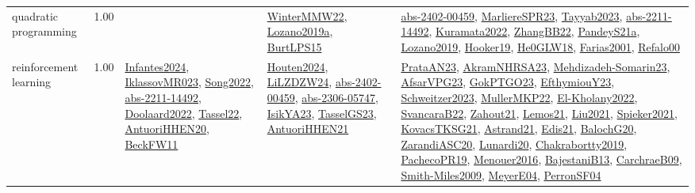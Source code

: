 {\begin{longtable}{p{3cm}r>{\raggedright\arraybackslash}p{6cm}>{\raggedright\arraybackslash}p{6cm}>{\raggedright\arraybackslash}p{8cm}}
\index{quadratic programming}\index{Algorithms!quadratic programming}quadratic programming &  1.00 &  & \hyperref[detail:WinterMMW22]{WinterMMW22}, \hyperref[detail:Lozano2019a]{Lozano2019a}, \hyperref[detail:BurtLPS15]{BurtLPS15} & \hyperref[detail:abs-2402-00459]{abs-2402-00459}, \hyperref[detail:MarliereSPR23]{MarliereSPR23}, \hyperref[detail:Tayyab2023]{Tayyab2023}, \hyperref[detail:abs-2211-14492]{abs-2211-14492}, \hyperref[detail:Kuramata2022]{Kuramata2022}, \hyperref[detail:ZhangBB22]{ZhangBB22}, \hyperref[detail:PandeyS21a]{PandeyS21a}, \hyperref[detail:Lozano2019]{Lozano2019}, \hyperref[detail:Hooker19]{Hooker19}, \hyperref[detail:He0GLW18]{He0GLW18}, \hyperref[detail:Farias2001]{Farias2001}, \hyperref[detail:Refalo00]{Refalo00}\\
\index{reinforcement learning}\index{Algorithms!reinforcement learning}reinforcement learning &  1.00 & \hyperref[detail:Infantes2024]{Infantes2024}, \hyperref[detail:IklassovMR023]{IklassovMR023}, \hyperref[detail:Song2022]{Song2022}, \hyperref[detail:abs-2211-14492]{abs-2211-14492}, \hyperref[detail:Doolaard2022]{Doolaard2022}, \hyperref[detail:Tassel22]{Tassel22}, \hyperref[detail:AntuoriHHEN20]{AntuoriHHEN20}, \hyperref[detail:BeckFW11]{BeckFW11} & \hyperref[detail:Houten2024]{Houten2024}, \hyperref[detail:LiLZDZW24]{LiLZDZW24}, \hyperref[detail:abs-2402-00459]{abs-2402-00459}, \hyperref[detail:abs-2306-05747]{abs-2306-05747}, \hyperref[detail:IsikYA23]{IsikYA23}, \hyperref[detail:TasselGS23]{TasselGS23}, \hyperref[detail:AntuoriHHEN21]{AntuoriHHEN21} & \hyperref[detail:PrataAN23]{PrataAN23}, \hyperref[detail:AkramNHRSA23]{AkramNHRSA23}, \hyperref[detail:Mehdizadeh-Somarin23]{Mehdizadeh-Somarin23}, \hyperref[detail:AfsarVPG23]{AfsarVPG23}, \hyperref[detail:GokPTGO23]{GokPTGO23}, \hyperref[detail:EfthymiouY23]{EfthymiouY23}, \hyperref[detail:Schweitzer2023]{Schweitzer2023}, \hyperref[detail:MullerMKP22]{MullerMKP22}, \hyperref[detail:El-Kholany2022]{El-Kholany2022}, \hyperref[detail:SvancaraB22]{SvancaraB22}, \hyperref[detail:Zahout21]{Zahout21}, \hyperref[detail:Lemos21]{Lemos21}, \hyperref[detail:Liu2021]{Liu2021}, \hyperref[detail:Spieker2021]{Spieker2021}, \hyperref[detail:KovacsTKSG21]{KovacsTKSG21}, \hyperref[detail:Astrand21]{Astrand21}, \hyperref[detail:Edis21]{Edis21}, \hyperref[detail:BalochG20]{BalochG20}, \hyperref[detail:ZarandiASC20]{ZarandiASC20}, \hyperref[detail:Lunardi20]{Lunardi20}, \hyperref[detail:Chakrabortty2019]{Chakrabortty2019}, \hyperref[detail:PachecoPR19]{PachecoPR19}, \hyperref[detail:Menouer2016]{Menouer2016}, \hyperref[detail:BajestaniB13]{BajestaniB13}, \hyperref[detail:CarchraeB09]{CarchraeB09}, \hyperref[detail:Smith-Miles2009]{Smith-Miles2009}, \hyperref[detail:MeyerE04]{MeyerE04}, \hyperref[detail:PerronSF04]{PerronSF04}\\

\end{longtable}}
